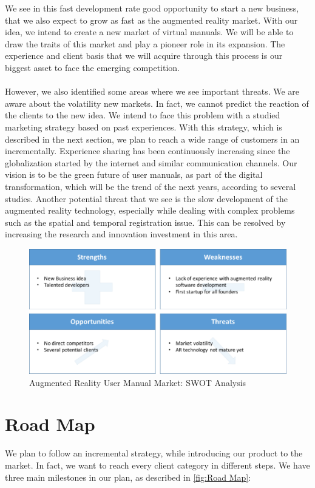 	We see in this fast development rate good opportunity to start a new business, that we also expect to grow as fast as the augmented reality market. With our idea, we intend to create a new market of virtual manuals. We will be able to draw the traits of this market and play a pioneer role in its expansion. The experience and client basis that we will acquire through this process is our biggest asset to face the emerging competition. \\
	\\
	However, we also identified some areas where we see important threats. We are aware about the volatility new markets. In fact, we cannot predict the reaction of the clients to the new idea. We intend to face this problem with a studied marketing strategy based on past experiences. With this strategy, which is described in the next section, we plan to reach a wide range of customers in an incrementally. Experience sharing has been continuously increasing since the globalization started by the internet and similar communication channels. Our vision is to be the green future of user manuals, as part of the digital transformation, which will be the trend of the next years, according to several studies. Another potential threat that we see is the slow development of the augmented reality technology, especially while dealing with complex problems such as the spatial and temporal registration issue. This can be resolved by increasing the research and innovation investment in this area. 
\begin{figure}[H]
		\includegraphics[width=\textwidth]{../images/SWOTanalysis.png}
		\centering
		\caption[Augmented Reality User Manual Market: SWOT Analysis]{Augmented Reality User Manual Market: SWOT Analysis}
		\label{fig:SWOT}
\end{figure}

\section{Road Map}
We plan to follow an incremental strategy, while introducing our product to the market. In fact, we want to reach every client category in different steps. We have three main milestones in our plan, as described in \autoref{fig:Road Map}:

